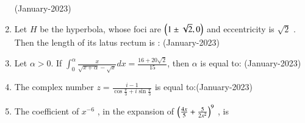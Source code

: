 \documentclass[journal]{IEEEtran}
\begin{document}
\begin{enumerate}
 \hfill(January-2023)
 \begin{enumerate}
 \end{enumerate}
 \item Let $H$ be the hyperbola, whose foci are $\left(1 \pm \sqrt{2}, 0\right)$
 and eccentricity is $\sqrt{2}$ 
. Then the length of its latus rectum is : \hfill(January-2023)
\begin{enumerate}
\end{enumerate}
\item Let $\alpha > 0$. If $\int_0^{\alpha} \frac{x}{\sqrt{x + \alpha} - \sqrt{x}}dx = \frac{16 + 20\sqrt{2}}{15}$, then $\alpha$ is equal to: \hfill(January-2023)
\begin{enumerate}
\end{enumerate}
\item The complex number $z = \frac{i - 1}{\cos{\frac{\pi}{3}} + i\sin{\frac{\pi}{3}}}$ is equal to:\hfill(January-2023)
\begin{enumerate}
\end{enumerate}
\item The coefficient of $x^{-6}$
, in the expansion of $\left(\frac{4x}{5} + \frac{5}{2x^2}\right)^9$
, is


\end{enumerate}
\end{document}
